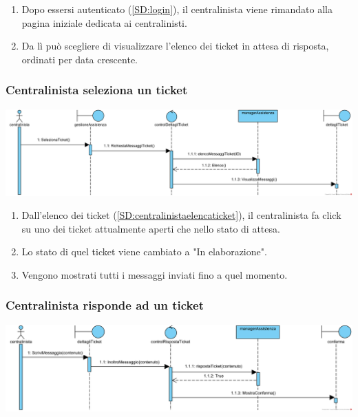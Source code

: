 \documentclass[12pt]{article}
\begin{document}
\begin{enumerate}
\item Dopo essersi autenticato (\ref{SD:login}), il centralinista viene rimandato alla pagina iniziale dedicata ai centralinisti. 
\item Da lì può scegliere di visualizzare l'elenco dei ticket in attesa di risposta, ordinati per data crescente.
\end{enumerate}

\subsubsection{Centralinista seleziona un ticket}
\label{SD:selezioneticketcentralinista}

\begin{center}
\includegraphics[width=\textwidth]{SequenceDiagram/CentralinistaTicketSeleziona}
\end{center}

\begin{enumerate}
\item Dall'elenco dei ticket (\ref{SD:centralinistaelencaticket}), il centralinista fa click su uno dei ticket attualmente aperti che nello stato di attesa.
\item Lo stato di quel ticket viene cambiato a "In elaborazione".
\item Vengono mostrati tutti i messaggi inviati fino a quel momento.
\end{enumerate}

\newpage

\subsubsection{Centralinista risponde ad un ticket}
\label{SD:rispostaticketcentralinista}

\begin{center}
\includegraphics[width=\textwidth]{SequenceDiagram/CentralinistaTicketRisponde}
\end{center}
\end{document}
